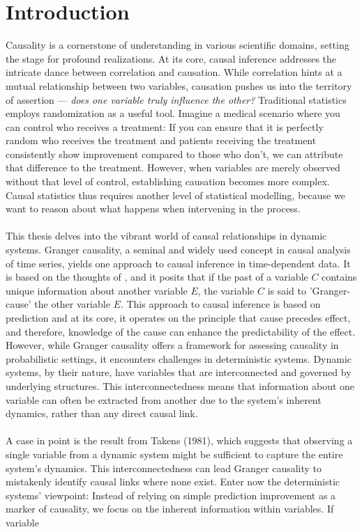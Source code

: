 \documentclass[11pt, a4paper]{memoir}
\theoremstyle{break}
\theoremstyle{break}
\theoremstyle{nonumberplain}
\begin{document}
\section*{Introduction}
Causality is a cornerstone of understanding in various scientific domains, setting the stage for profound realizations. At its core, causal inference addresses the intricate dance between correlation and causation. While correlation hints at a mutual relationship between two variables, causation pushes us into the territory of assertion — \textit{does one variable truly influence the other?} Traditional statistics employs randomization as a useful tool. Imagine a medical scenario where you can control who receives a treatment: If you can ensure that it is perfectly random who receives the treatment and patients receiving the treatment consistently show improvement compared to those who don't, we can attribute that difference to the treatment. However, when variables are merely observed without that level of control, establishing causation becomes more complex. Causal statistics thus requires another level of statistical modelling, because we want to reason about what happens when intervening in the process.\\\\
This thesis delves into the vibrant world of causal relationships in dynamic systems. Granger causality, a seminal and widely used concept in causal analysis of time series, yields one approach to causal inference in time-dependent data. It is based on the thoughts of \cite{Granger}, and it posits that if the past of a variable $C$ contains unique information about another variable $E$, the variable $C$ is said to 'Granger-cause' the other variable $E$. This approach to causal inference is based on prediction and at its core, it operates on the principle that cause precedes effect, and therefore, knowledge of the cause can enhance the predictability of the effect. However, while Granger causality offers a framework for assessing causality in probabilistic settings, it encounters challenges in deterministic systems. Dynamic systems, by their nature, have variables that are interconnected and governed by underlying structures. This interconnectedness means that information about one variable can often be extracted from another due to the system's inherent dynamics, rather than any direct causal link.\\\\
A case in point is the result from Takens (1981), which suggests that observing a single variable from a dynamic system might be sufficient to capture the entire system's dynamics. This interconnectedness can lead Granger causality to mistakenly identify causal links where none exist. Enter now the deterministic systems' viewpoint: Instead of relying on simple prediction improvement as a marker of causality, we focus on the inherent information within variables. If variable 
\end{document}
